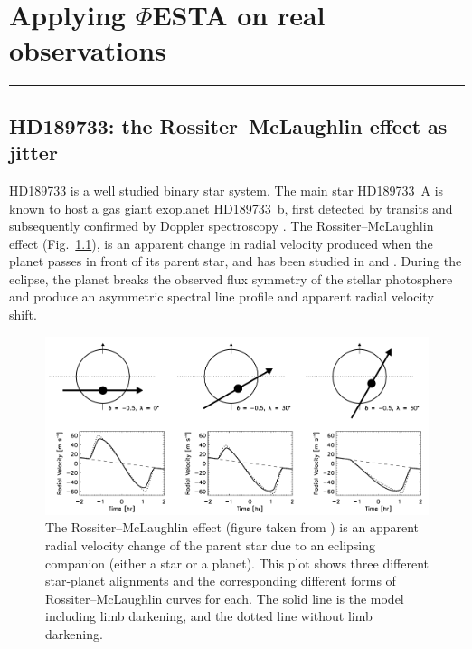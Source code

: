 \chapter{Applying $\mathit{\Phi}$ESTA on real observations}
\label{\thechapter}
\label{ch:Observations}


\rule{\textwidth}{1.6pt}
\minitoc
\clearpage



\section{HD189733: the Rossiter–McLaughlin effect as jitter}
\label{\thesection}
\label{sec:HD189733}

HD189733 is a well studied binary star system. The main star HD189733~A is known to host a gas giant exoplanet HD189733~b, first detected by transits and subsequently confirmed by Doppler spectroscopy \cite{Bouchy2005ELODIE}. The Rossiter–McLaughlin effect (Fig.~\ref{fig:rm-effect}), is an apparent change in radial velocity produced when the planet passes in front of its parent star, and has been studied in \cite{Cochran2006} and \cite{Triaud2009}. During the eclipse, the planet breaks the observed flux symmetry of the stellar photosphere and produce an asymmetric spectral line profile and apparent radial velocity shift.

\begin{figure}[htbp]
\centering
\includegraphics[width = 0.80 \linewidth]
{./Figures/Methods/rmeffect.png}
\caption[The Rossiter–McLaughlin effect]
{The Rossiter–McLaughlin effect (figure taken from \cite{Gaudi2007}) is an apparent radial velocity change of the parent star due to an eclipsing companion (either a star or a planet). This plot shows three different star-planet alignments and the corresponding different forms of Rossiter–McLaughlin curves for each. The solid line is the model including limb darkening, and the dotted line without limb darkening.}
\label{fig:rm-effect}
\end{figure} 

